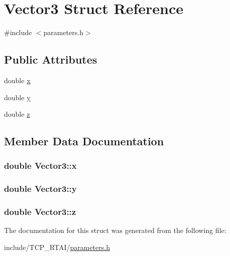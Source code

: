 \hypertarget{structVector3}{
\section{Vector3 Struct Reference}
\label{structVector3}
}


{\ttfamily \#include $<$parameters.h$>$}

\subsection*{Public Attributes}
\begin{DoxyCompactItemize}
\item 
double \hyperlink{structVector3_a60aa84ebc037dec9faba617f8ddb231d}{x}
\item 
double \hyperlink{structVector3_ae4965693beffdb6069e0618222cae459}{y}
\item 
double \hyperlink{structVector3_aa5f4108b2839a110eeaec8606780eaff}{z}
\end{DoxyCompactItemize}


\subsection{Member Data Documentation}
\hypertarget{structVector3_a60aa84ebc037dec9faba617f8ddb231d}{
\subsubsection[{x}]{\setlength{\rightskip}{0pt plus 5cm}double {\bf Vector3::x}}}
\label{structVector3_a60aa84ebc037dec9faba617f8ddb231d}
\hypertarget{structVector3_ae4965693beffdb6069e0618222cae459}{
\subsubsection[{y}]{\setlength{\rightskip}{0pt plus 5cm}double {\bf Vector3::y}}}
\label{structVector3_ae4965693beffdb6069e0618222cae459}
\hypertarget{structVector3_aa5f4108b2839a110eeaec8606780eaff}{
\subsubsection[{z}]{\setlength{\rightskip}{0pt plus 5cm}double {\bf Vector3::z}}}
\label{structVector3_aa5f4108b2839a110eeaec8606780eaff}


The documentation for this struct was generated from the following file:\begin{DoxyCompactItemize}
\item 
include/TCP\_\-RTAI/\hyperlink{include_2TCP__RTAI_2parameters_8h}{parameters.h}\end{DoxyCompactItemize}
